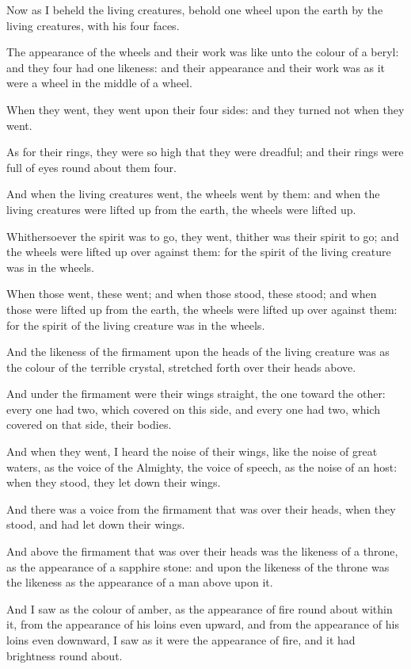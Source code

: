 \Verse Now as I beheld the living creatures, behold one wheel upon the earth by the living creatures, with his four faces.

\Verse The appearance of the wheels and their work was like unto the colour of a beryl: and they four had one likeness: and their appearance and their work was as it were a wheel in the middle of a wheel.

\Verse When they went, they went upon their four sides: and they turned not when they went.

\Verse As for their rings, they were so high that they were dreadful; and their rings were full of eyes round about them four.

\Verse And when the living creatures went, the wheels went by them: and when the living creatures were lifted up from the earth, the wheels were lifted up.

\Verse Whithersoever the spirit was to go, they went, thither was their spirit to go; and the wheels were lifted up over against them: for the spirit of the living creature was in the wheels.

\Verse When those went, these went; and when those stood, these stood; and when those were lifted up from the earth, the wheels were lifted up over against them: for the spirit of the living creature was in the wheels.

\Verse And the likeness of the firmament upon the heads of the living creature was as the colour of the terrible crystal, stretched forth over their heads above.

\Verse And under the firmament were their wings straight, the one toward the other: every one had two, which covered on this side, and every one had two, which covered on that side, their bodies.

\Verse And when they went, I heard the noise of their wings, like the noise of great waters, as the voice of the Almighty, the voice of speech, as the noise of an host: when they stood, they let down their wings.

\Verse And there was a voice from the firmament that was over their heads, when they stood, and had let down their wings.

\Verse And above the firmament that was over their heads was the likeness of a throne, as the appearance of a sapphire stone: and upon the likeness of the throne was the likeness as the appearance of a man above upon it.

\Verse And I saw as the colour of amber, as the appearance of fire round about within it, from the appearance of his loins even upward, and from the appearance of his loins even downward, I saw as it were the appearance of fire, and it had brightness round about.

